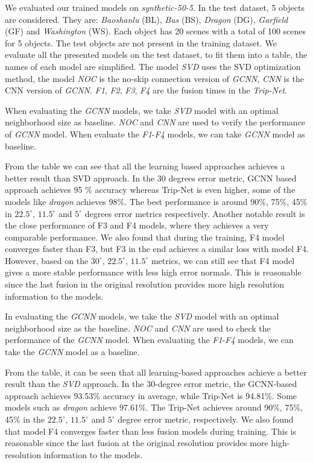 We evaluated our trained models on \textit{synthetic-50-5}. In the test dataset, 5 objects are considered. They are: \textit{Baoshanlu} (BL), \textit{Bus} (BS), \textit{Dragon} (DG), \textit{Garfield} (GF) and \textit{Washington} (WS). Each object has 20 scenes with a total of 100 scenes for 5 objects. The test objects are not present in the training dataset. We evaluate all the presented models on the test dataset, to fit them into a table, the names of each model are simplified. The model \textit{SVD} uses the SVD optimization method, the model \textit{NOC} is the no-skip connection version of \textit{GCNN}, \textit{CNN} is the CNN version of \textit{GCNN}. \textit{F1}, \textit{F2}, \textit{F3}, \textit{F4} are the fusion times in the \textit{Trip-Net}. 




When evaluating the \textit{GCNN} models, we take \textit{SVD} model with an optimal neighborhood size as baseline. \textit{NOC} and \textit{CNN} are used to verify the performance of \textit{GCNN} model. When evaluate the \textit{F1}-\textit{F4} models, we can take \textit{GCNN} model as baseline. 

From the table we can see that all the learning based approaches achieves a better result than SVD approach. In the 30 degrees error metric, GCNN based approach achieves 95 \% accuracy whereas Trip-Net is even higher, some of the models like \textit{dragon} achieves 98\%. The best performance is around 90\%, 75\%, 45\% in $ 22.5^\circ $, $ 11.5^\circ $ and $ 5^\circ $ degrees error metrics respectively. Another notable result is the close performance of F3 and F4 models, where they achieves a very comparable performance. We also found that during the training, F4 model converges faster than F3, but F3 in the end achieves a similar loss with model F4. However, based on the $ 30^\circ $, $ 22.5^\circ $, $ 11.5^\circ $ metrics, we can still see that F4 model gives a more stable performance with less high error normals. This is reasonable since the last fusion in the original resolution provides more high resolution information to the models.

In evaluating the \textit{GCNN} models, we take the \textit{SVD} model with an optimal neighborhood size as the baseline. \textit{NOC} and \textit{CNN} are used to check the performance of the \textit{GCNN} model. When evaluating the \textit{F1}-\textit{F4} models, we can take the \textit{GCNN} model as a baseline. 


From the table, it can be seen that all learning-based approaches achieve a better result than the \textit{SVD} approach. In the 30-degree error metric, the GCNN-based approach achieves 93.53\% accuracy in average, while Trip-Net is 94.81\%. Some models such as \textit{dragon} achieve 97.61\%. 
The Trip-Net achieves around 90\%, 75\%, 45\% in the $ 22.5^\circ $, $ 11.5^\circ $ and $ 5^\circ $ degree error metric, respectively. We also found that model F4 converges faster than less fusion models during training. This is reasonable since the last fusion at the original resolution provides more high-resolution information to the models.


